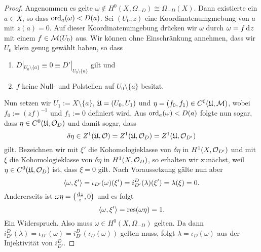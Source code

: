 \begin{proof}
  Angenommen es gelte $\omega \notin H^0(X, \Omega_{-D}) \cong
  \Omega_{-D}(X)$. Dann existierte ein $a \in X$, so dass
  $\operatorname{ord}_a(\omega) < D(a)$. Sei $(U_0, z)$ eine Koordinatenumgmebung
  von $a$ mit $z(a) = 0$. Auf dieser Koordinatenumgebung drücken wir
  $\omega$ durch $\omega = f \d[z]$ mit einem $f \in \mathcal{M}(U_0)$
  aus. Wir können ohne Einschränkung annehmen, dass wir $U_0$ klein
  genug gewählt haben, so dass
  \begin{enumerate}
  \item $D|_{U_0 \setminus \{a\}} \equiv 0 \equiv D'|_{U_0 \setminus
      \{a\}}$ gilt und
  \item $f$ keine Null- und Polstellen auf $U_0 \setminus \{a\}$ besitzt.
  \end{enumerate}
  Nun setzen wir $U_1 := X \setminus \{a\}$, $\mathfrak{U} = (U_0, U_1)$ und
  $\eta = (f_0, f_1) \in C^0(\mathfrak{U}, \mathcal{M})$, wobei $f_0 := (zf)^{-1}$ und
  $f_1 := 0$ definiert wird. Aus $\operatorname{ord}_a(\omega) < D(a)$ folgte nun
  sogar, dass $\eta \in C^0(\mathfrak{U}, \mathcal{O}_D)$ und damit sogar, dass
  \[
  \delta \eta \in Z^1(\mathfrak{U}, \mathcal{O}) = Z^1(\mathfrak{U}, \mathcal{O}_D) = Z^1(\mathfrak{U},
  \mathcal{O}_{D'})
  \]
  gilt. Bezeichnen wir mit $\xi'$ die
  Kohomologieklasse von $\delta \eta$ in $H^1(X, \mathcal{O}_{D'})$ und mit
  $\xi$ die Kohomologieklasse von $\delta \eta$ in $H^1(X, \mathcal{O}_D)$,
  so erhalten wir zunächst, weil $\eta \in C^0(\mathfrak{U}, \mathcal{O}_D)$ ist, dass
  $\xi = 0$ gilt. Nach Voraussetzung gälte nun aber
  \[
  \langle \omega, \xi' \rangle = \iota_{D'}(\omega)(\xi') =
  i_{D'}^D(\lambda)(\xi') = \lambda(\xi) = 0.
  \]
  Andererseits ist $\omega \eta = \left ( \frac{\d[z]}{z}, 0 \right )$
  und es folgt
  \[
  \langle \omega, \xi' \rangle = \operatorname{res}(\omega \eta) = 1.
  \]
  Ein Widerspruch. Also muss $\omega \in H^0(X, \Omega_{-D})$
  gelten. Da dann $i_{D'}^D(\lambda) = \iota_{D'}(\omega) =
  i_{D'}^D(\iota_D(\omega))$ gelten muss, folgt $\lambda =
  \iota_D(\omega)$ aus der Injektivität von $i_{D'}^D$.
\end{proof}

